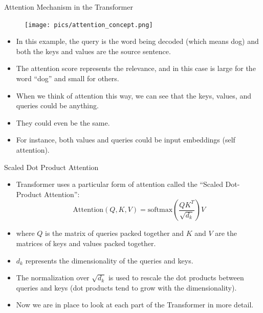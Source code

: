 \documentclass[handout]{beamer}
\begin{document}
\begin{frame}{Attention Mechanism in the Transformer}

    \begin{figure}[h]
        	\texttt{[image: pics/attention\_concept.png]}
        \end{figure}  

\begin{scriptsize}
\begin{itemize}        
\item In this example, the query is the word being decoded (which means dog) and both the keys and values are the source sentence. 
\item The attention score represents the relevance, and in this case is large for the word “dog” and small for others.
 \item When we think of attention this way, we can see that the keys, values, and queries could be anything. 
 \item They could even be the same. 
 \item For instance, both values and queries could be input embeddings (self attention). 
\end{itemize}

\end{scriptsize}

\end{frame}






\begin{frame}{Scaled Dot Product Attention}
\begin{scriptsize}
\begin{itemize}

  \item  Transformer uses a particular form of attention called the “Scaled Dot-Product Attention”:
 \begin{displaymath}
  \text{Attention}(Q,K,V) = \text{softmax}\left(\frac{QK^T}{\sqrt{d_k}}\right)V
 \end{displaymath}

 \item where $Q$ is the matrix of queries packed together and $K$ and $V$ are the matrices of keys and values packed together. 
 
 \item $d_k$ represents the dimensionality of the queries and keys.
 
  \item The normalization over $\sqrt{d_k}$ is used to rescale the dot products between queries and keys (dot products tend to grow with the dimensionality).
 
 \item Now we are in place to look at each part of the Transformer in more detail.


\end{itemize}

\end{scriptsize}

\end{frame}
\end{document}
